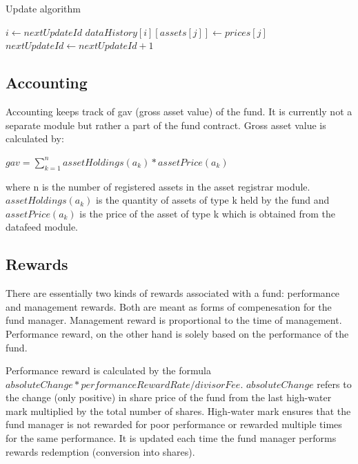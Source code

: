 \documentclass[conference]{IEEEtran}
\begin{document}
\begin{algorithm}
	\caption{Update algorithm}
	\label{update}
	\begin{algorithmic}[1] %
		 
		\State $i\gets nextUpdateId$
		\State $dataHistory[i][assets[j]] \gets prices[j]$ 
		\EndFor\label{euclidendwhile}
		\State $nextUpdateId \gets nextUpdateId + 1$
		\EndProcedure
	\end{algorithmic}
\end{algorithm}

\subsection{Accounting} \label{component:accounting}

Accounting keeps track of gav (gross asset value) of the fund. It is currently not a separate module but rather a part of the fund contract. Gross asset value is calculated by:


$gav = \sum_{k=1}^{n} assetHoldings(a_k) * assetPrice(a_k)$


where n is the number of registered assets in the asset registrar module. $assetHoldings(a_k)$  is the quantity of assets of type k held by the fund and $assetPrice(a_k)$ is the price of the asset of type k which is obtained from the datafeed module.

\subsection{Rewards}

There are essentially two kinds of rewards associated with a fund: performance and management rewards. Both are meant as forms of compenesation for the fund manager. Management reward is proportional to the time of management. Performance reward, on the other hand is solely based on the performance of the fund.

Performance reward  is calculated by the formula $absoluteChange * performanceRewardRate / divisorFee$. $absoluteChange$ refers to the change (only positive) in share price of the fund from the last high-water mark multiplied by the total number of shares. High-water mark ensures that the fund manager is not rewarded for poor performance or rewarded multiple times for the same performance. It is updated each time the fund manager performs rewards redemption (conversion into shares).
\end{document}
